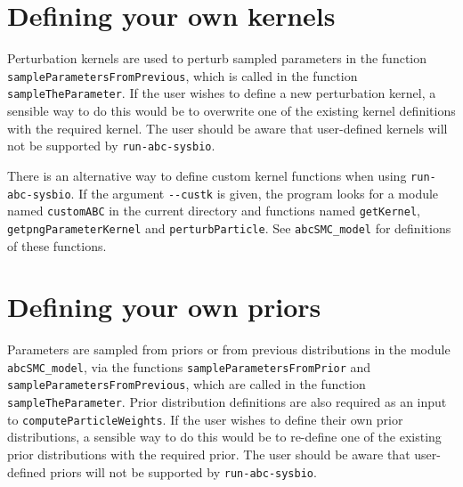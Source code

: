 \documentclass[a4paper]{report}
\begin{document}
\section{Defining your own kernels}
Perturbation kernels are used to perturb sampled parameters in the function \verb$sampleParametersFromPrevious$, which is called in the function \verb$sampleTheParameter$. If the user wishes to define a new perturbation kernel, a sensible way to do this would be to overwrite one of the existing kernel definitions with the required kernel. The user should be aware that user-defined kernels will not be supported by \verb$run-abc-sysbio$. 

There is an alternative way to define custom kernel functions when using \verb$run-abc-sysbio$. If the argument \verb$--custk$ is given, the program looks for a module named \verb$customABC$ in the current directory and functions named \verb$getKernel$, \verb$getpngParameterKernel$ and \verb$perturbParticle$. See 
\verb$abcSMC_model$ for definitions of these functions.

\section{Defining your own priors}
Parameters are sampled from priors or from previous distributions in the module \verb$abcSMC_model$, via the functions \verb$sampleParametersFromPrior$ and \verb$sampleParametersFromPrevious$, which are called in the function \verb$sampleTheParameter$. Prior distribution definitions are also required as an input to \verb$computeParticleWeights$.  If the user wishes to define their own prior distributions, a sensible way to do this would be to re-define one of the existing prior distributions with the required prior. The user should be aware that user-defined priors will not be supported by \verb$run-abc-sysbio$. 
\end{document}
